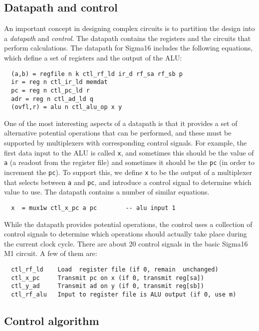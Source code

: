 \documentclass[submission,copyright,creativecommons]{eptcs}
\begin{document}
\subsection{Datapath and control}

An important concept in designing complex circuits is to partition the
design into a \emph{datapath} and \emph{control}.  The datapath
contains the registers and the circuits that perform calculations.
The datapath for Sigma16 includes the following equations, which
define a set of registers and the output of the ALU:

\begin{verbatim}
  (a,b) = regfile n k ctl_rf_ld ir_d rf_sa rf_sb p
  ir = reg n ctl_ir_ld memdat
  pc = reg n ctl_pc_ld r
  adr = reg n ctl_ad_ld q
  (ovfl,r) = alu n ctl_alu_op x y
\end{verbatim}

One of the most interesting aspects of a datapath is that it provides
a set of alternative potential operations that can be performed, and
these must be supported by multiplexers with corresponding control
signals.  For example, the first data input to the ALU is called
\texttt{x}, and sometimes this should be the value of \texttt{a} (a
readout from the register file) and sometimes it should be the
\texttt{pc} (in order to increment the \texttt{pc}).  To support this,
we define \texttt{x} to be the output of a multiplexer that selects
between \texttt{a} and \texttt{pc}, and introduce a control signal to
determine which value to use.  The datapath contains a number of
similar equations.

\begin{verbatim}
  x  = mux1w ctl_x_pc a pc        -- alu input 1
\end{verbatim}

While the datapath provides potential operations, the control uses
a collection of control signals to determine which operations
should actually take place during the current clock cycle.
There are about 20 control signals in the basic Sigma16 M1 circuit.
A few of them are:

{\footnotesize
\begin{verbatim}
  ctl_rf_ld    Load  register file (if 0, remain  unchanged)
  ctl_x_pc     Transmit pc on x (if 0, transmit reg[sa])
  ctl_y_ad     Transmit ad on y (if 0, transmit reg[sb])
  ctl_rf_alu   Input to register file is ALU output (if 0, use m)
\end{verbatim}
}

\subsection{Control algorithm}
\end{document}

